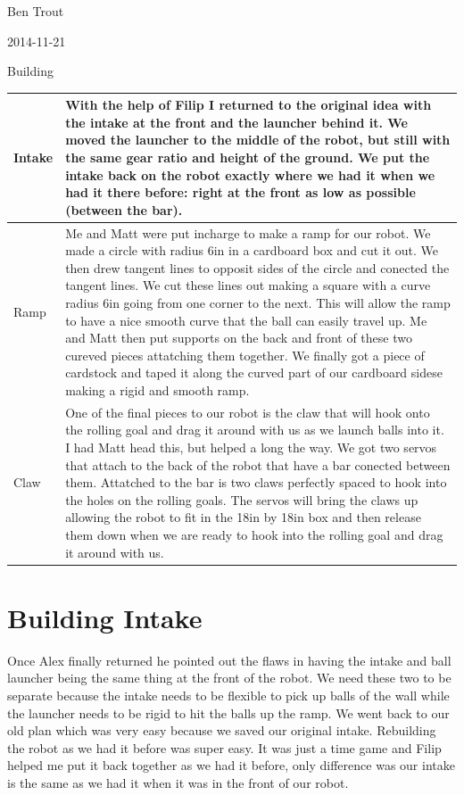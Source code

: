 Ben Trout

2014-11-21

Building  

\begin{tabular}{|p{4cm}|p{6cm}|}
\hline
 Intake&
With the help of Filip I returned to the original idea with the intake at the front and the launcher behind it. We moved the launcher to the middle of the robot, but still with the same gear ratio and height of the ground. We put the intake back on the robot exactly where we had it when we had it there before: right at the front as low as possible (between the bar).
\\
\hline
Ramp&
Me and Matt were put incharge to make a ramp for our robot. We made a circle with radius 6in in a cardboard box and cut it out. We then drew tangent lines to opposit sides of the circle and conected the tangent lines. We cut these lines out making a square with a curve radius 6in going from one corner to the next. This will allow the ramp to have a nice smooth curve that the ball can easily travel up. Me and Matt then put supports on the back and front of these two cureved pieces attatching them together. We finally got a piece of cardstock and taped it along the curved part of our cardboard sidese making a rigid and smooth ramp. 
\\
\hline
Claw&
One of the final pieces to our robot is the claw that will hook onto the rolling goal and drag it around with us as we launch balls into it. I had Matt head this, but helped a long the way. We got two servos that attach to the back of the robot that have a bar conected between them. Attatched to the bar is two claws perfectly spaced to hook into the holes on the rolling goals. The servos will bring the claws up allowing the robot to fit in the 18in by 18in box and then release them down when we are ready to hook into the rolling goal and drag it around with us. 
\\
\hline
\end{tabular}

\section*{Building Intake}
Once Alex finally returned he pointed out the flaws in having the intake and ball launcher being the same thing at the front of the robot. We need these two to be separate because the intake needs to be flexible to pick up balls of the wall while the launcher needs to be rigid to hit the balls up the ramp. We went back to our old plan which was very easy because we saved our original intake. Rebuilding the robot as we had it before was super easy. It was just a time game and Filip helped me put it back together as we had it before, only difference was our intake is the same as we had it when it was in the front of our robot. 

